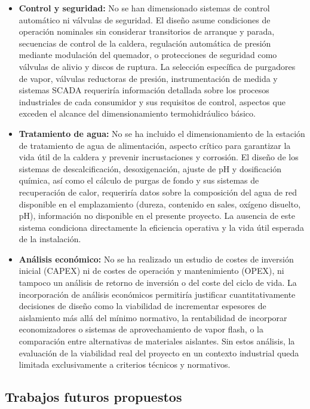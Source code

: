 \documentclass[12pt]{article}
\begin{document}
\begin{itemize}[leftmargin=2em]
	\item \textbf{Control y seguridad:} No se han dimensionado sistemas de control automático ni válvulas de seguridad. El diseño asume condiciones de operación nominales sin considerar transitorios de arranque y parada, secuencias de control de la caldera, regulación automática de presión mediante modulación del quemador, o protecciones de seguridad como válvulas de alivio y discos de ruptura. La selección específica de purgadores de vapor, válvulas reductoras de presión, instrumentación de medida y sistemas SCADA requeriría información detallada sobre los procesos industriales de cada consumidor y sus requisitos de control, aspectos que exceden el alcance del dimensionamiento termohidráulico básico.

	\item \textbf{Tratamiento de agua:} No se ha incluido el dimensionamiento de la estación de tratamiento de agua de alimentación, aspecto crítico para garantizar la vida útil de la caldera y prevenir incrustaciones y corrosión. El diseño de los sistemas de descalcificación, desoxigenación, ajuste de pH y dosificación química, así como el cálculo de purgas de fondo y sus sistemas de recuperación de calor, requeriría datos sobre la composición del agua de red disponible en el emplazamiento (dureza, contenido en sales, oxígeno disuelto, pH), información no disponible en el presente proyecto. La ausencia de este sistema condiciona directamente la eficiencia operativa y la vida útil esperada de la instalación.

	\item \textbf{Análisis económico:} No se ha realizado un estudio de costes de inversión inicial (CAPEX) ni de costes de operación y mantenimiento (OPEX), ni tampoco un análisis de retorno de inversión o del coste del ciclo de vida. La incorporación de análisis económicos permitiría justificar cuantitativamente decisiones de diseño como la viabilidad de incrementar espesores de aislamiento más allá del mínimo normativo, la rentabilidad de incorporar economizadores o sistemas de aprovechamiento de vapor flash, o la comparación entre alternativas de materiales aislantes. Sin estos análisis, la evaluación de la viabilidad real del proyecto en un contexto industrial queda limitada exclusivamente a criterios técnicos y normativos.
\end{itemize}

\subsection{Trabajos futuros propuestos}
\label{subsec:trabajos-futuros}
\end{document}
